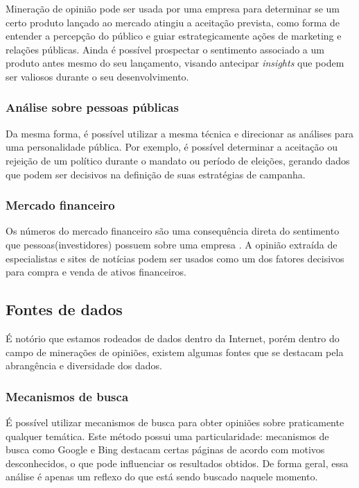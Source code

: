 Mineração de opinião pode ser usada por uma empresa para determinar se um certo produto lançado ao mercado atingiu a aceitação prevista, como forma de entender a percepção do público e guiar estrategicamente ações de marketing e relações públicas. Ainda é possível prospectar o sentimento associado a um produto antes mesmo do seu lançamento, visando antecipar \textit{insights} que podem ser valiosos durante o seu desenvolvimento.

\subsubsection{Análise sobre pessoas públicas}

Da mesma forma, é possível utilizar a mesma técnica e direcionar as análises para uma personalidade pública. Por exemplo, é possível determinar a aceitação ou rejeição de um político durante o mandato ou período de eleições, gerando dados que podem ser decisivos na definição de suas estratégias de campanha. 

\subsubsection{Mercado financeiro}

Os números do mercado financeiro são uma consequência direta do sentimento que pessoas(investidores) possuem sobre uma empresa \cite{villela2013financcas}. A opinião extraída de especialistas e sites de notícias podem ser usados como um dos fatores decisivos para compra e venda de ativos financeiros.

\subsection{Fontes de dados}

É notório que estamos rodeados de dados dentro da Internet, porém dentro do campo de minerações de opiniões, existem algumas fontes que se destacam pela abrangência e diversidade dos dados.

\subsubsection{Mecanismos de busca}

É possível utilizar mecanismos de busca para obter opiniões sobre praticamente qualquer temática. Este método possui uma particularidade: mecanismos de busca como Google e Bing destacam certas páginas de acordo com motivos desconhecidos, o que pode influenciar os resultados obtidos. De forma geral, essa análise é apenas um reflexo do que está sendo buscado naquele momento.

